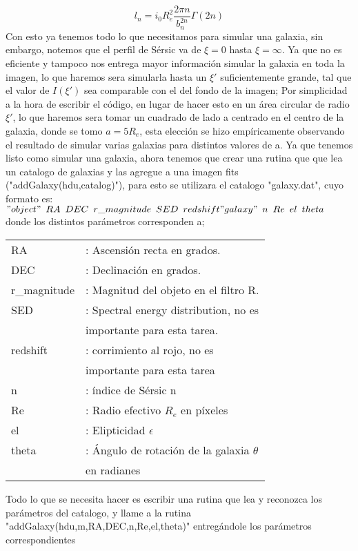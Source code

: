 \documentclass[twocolumn]{AS4201}
\begin{document}
\begin{equation}
	l_n=i_0R_e^2\frac{2\pi n}{b_n^{2n}}\Gamma(2n)
\end{equation}
Con esto ya tenemos todo lo que necesitamos para simular una galaxia, sin embargo, notemos que el perfil de S\'ersic va de $\xi=0$ hasta $\xi=\infty$. Ya que no es eficiente y tampoco nos entrega mayor información simular la galaxia en toda la imagen, lo que haremos sera simularla hasta un $\xi'$ suficientemente grande, tal que el valor de $I(\xi')$ sea comparable con el del fondo de la imagen; Por simplicidad a la hora de escribir el código, en lugar de hacer esto en un área circular de radio $\xi'$, lo que haremos sera tomar un cuadrado de lado a centrado en el centro de la galaxia, donde se tomo $a=5R_e$, esta elección se hizo empíricamente observando el resultado de simular varias galaxias para distintos valores de a.
Ya que tenemos listo como simular una galaxia, ahora tenemos que crear una rutina que que lea un catalogo de galaxias y las agregue a una imagen fits ("addGalaxy(hdu,catalog)"), para esto se utilizara el catalogo "galaxy.dat", cuyo formato es:\\
$\\
"object"\hspace{5pt}	RA\hspace{5pt}	DEC\hspace{5pt}	r\_magnitude\hspace{5pt}	SED\hspace{5pt}	redshift\\	"galaxy"\hspace{5pt} n\hspace{5pt}	Re\hspace{5pt}	el\hspace{5pt}	theta\\
$\\
donde los distintos parámetros corresponden a;
\begin{flushleft}
	\label{table:2}      %
	\begin{tabular}{ll}        %
	RA&: Ascensión recta en grados. \\
	DEC&: Declinación en grados.  \\
	r\_magnitude&: Magnitud del objeto en el filtro R.\\
	SED&: Spectral energy distribution, no es \\ 
	 & importante para esta tarea. \\
	redshift&: corrimiento al rojo, no es \\& importante para esta tarea\\	
	n&: índice de S\'ersic n\\
	Re&: Radio efectivo $R_e$ en píxeles\\
	el&: Elipticidad $\epsilon$\\
	theta&: Ángulo de rotación de la galaxia $\theta$ \\&en radianes
\end{tabular}\end{flushleft}
Todo lo que se necesita hacer es escribir una rutina que lea y reconozca los parámetros del catalogo, y llame a la rutina "addGalaxy(hdu,m,RA,DEC,n,Re,el,theta)" entregándole los parámetros correspondientes
\end{document}
